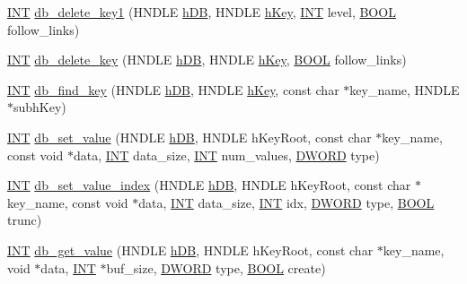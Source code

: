 \begin{DoxyCompactItemize}
\item 
\hyperlink{vppg_8h_a392e62da233ed3e2f7c3fd4f487a3896}{INT} \hyperlink{group__odbfunctionc_ga3015b0f8e9636ebfeeea74e1dbdfaf62}{db\_\-delete\_\-key1} (HNDLE \hyperlink{mevb_8c_ab1f60c53f74e806a3b9f687af38d7421}{hDB}, HNDLE \hyperlink{mevb_8c_a8cd567d23219ba7fc83280cf20caf1c2}{hKey}, \hyperlink{vppg_8h_a392e62da233ed3e2f7c3fd4f487a3896}{INT} level, \hyperlink{vt2_8h_a239c7f0d40651c3e419c5b9651507d14}{BOOL} follow\_\-links)
\item 
\hyperlink{vppg_8h_a392e62da233ed3e2f7c3fd4f487a3896}{INT} \hyperlink{group__odbfunctionc_ga50caf089afbb03943e6e215661b5b73e}{db\_\-delete\_\-key} (HNDLE \hyperlink{mevb_8c_ab1f60c53f74e806a3b9f687af38d7421}{hDB}, HNDLE \hyperlink{mevb_8c_a8cd567d23219ba7fc83280cf20caf1c2}{hKey}, \hyperlink{vt2_8h_a239c7f0d40651c3e419c5b9651507d14}{BOOL} follow\_\-links)
\item 
\hyperlink{vppg_8h_a392e62da233ed3e2f7c3fd4f487a3896}{INT} \hyperlink{group__odbfunctionc_ga321df44195a9cbc83dbf10e32e32fd5b}{db\_\-find\_\-key} (HNDLE \hyperlink{mevb_8c_ab1f60c53f74e806a3b9f687af38d7421}{hDB}, HNDLE \hyperlink{mevb_8c_a8cd567d23219ba7fc83280cf20caf1c2}{hKey}, const char $\ast$key\_\-name, HNDLE $\ast$subhKey)
\item 
\hyperlink{vppg_8h_a392e62da233ed3e2f7c3fd4f487a3896}{INT} \hyperlink{group__odbfunctionc_gaf0b052657ba1d4f4a8b6d47dbc70008c}{db\_\-set\_\-value} (HNDLE \hyperlink{mevb_8c_ab1f60c53f74e806a3b9f687af38d7421}{hDB}, HNDLE hKeyRoot, const char $\ast$key\_\-name, const void $\ast$data, \hyperlink{vppg_8h_a392e62da233ed3e2f7c3fd4f487a3896}{INT} data\_\-size, \hyperlink{vppg_8h_a392e62da233ed3e2f7c3fd4f487a3896}{INT} num\_\-values, \hyperlink{vt2_8h_a798af1e30bc65f319c1a246cecf59e39}{DWORD} type)
\item 
\hyperlink{vppg_8h_a392e62da233ed3e2f7c3fd4f487a3896}{INT} \hyperlink{group__odbfunctionc_ga88a578560f272f0cc9a199eacb3e1048}{db\_\-set\_\-value\_\-index} (HNDLE \hyperlink{mevb_8c_ab1f60c53f74e806a3b9f687af38d7421}{hDB}, HNDLE hKeyRoot, const char $\ast$key\_\-name, const void $\ast$data, \hyperlink{vppg_8h_a392e62da233ed3e2f7c3fd4f487a3896}{INT} data\_\-size, \hyperlink{vppg_8h_a392e62da233ed3e2f7c3fd4f487a3896}{INT} idx, \hyperlink{vt2_8h_a798af1e30bc65f319c1a246cecf59e39}{DWORD} type, \hyperlink{vt2_8h_a239c7f0d40651c3e419c5b9651507d14}{BOOL} trunc)
\item 
\hyperlink{vppg_8h_a392e62da233ed3e2f7c3fd4f487a3896}{INT} \hyperlink{group__odbfunctionc_gaf3958854e073e1ddbb43324e07a6287f}{db\_\-get\_\-value} (HNDLE \hyperlink{mevb_8c_ab1f60c53f74e806a3b9f687af38d7421}{hDB}, HNDLE hKeyRoot, const char $\ast$key\_\-name, void $\ast$data, \hyperlink{vppg_8h_a392e62da233ed3e2f7c3fd4f487a3896}{INT} $\ast$buf\_\-size, \hyperlink{vt2_8h_a798af1e30bc65f319c1a246cecf59e39}{DWORD} type, \hyperlink{vt2_8h_a239c7f0d40651c3e419c5b9651507d14}{BOOL} create)

\end{DoxyCompactItemize}
